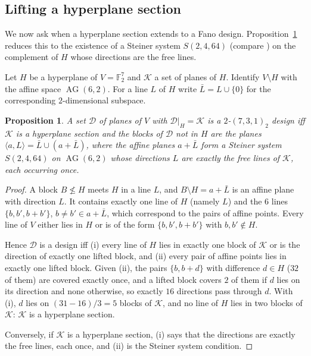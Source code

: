 \documentclass[11pt]{amsart}
\newtheorem{proposition}[theorem]{Proposition}
\theoremstyle{definition}
\newcommand{\F}{\mathbb{F}}
\newcommand{\D}{\mathcal{D}}
\newcommand{\K}{\mathcal{K}}
\newcommand{\AG}{\operatorname{AG}}
\begin{document}
\subsection{Lifting a hyperplane section}
We now ask when a hyperplane section extends to a Fano design. Proposition~\ref{prop:lift} reduces this to the existence of a Steiner system $S(2,4,64)$ \textup{(}compare \cite[Thm.~3.1]{EV11}\textup{)} on the complement of $H$ whose directions are the free lines.

Let $H$ be a hyperplane of $V=\F_2^7$ and $\K$ a set of planes of $H$. Identify $V\setminus H$ with the affine space $\AG(6,2)$. For a line $L$ of $H$ write $\bar L=L\cup\{0\}$ for the corresponding $2$-dimensional subspace.

\begin{proposition}\label{prop:lift}
A set $\D$ of planes of $V$ with $\D|_H=\K$ is a $2$-$(7,3,1)_2$ design iff $\K$ is a hyperplane section and the blocks of $\D$ not in $H$ are the planes $\langle a,L\rangle=\bar L\cup(a+\bar L)$, where the affine planes $a+\bar L$ form a Steiner system $S(2,4,64)$ on $\AG(6,2)$ whose directions $L$ are exactly the free lines of $\K$, each occurring once.
\end{proposition}

\begin{proof}
A block $B\not\le H$ meets $H$ in a line $L$, and $B\setminus H=a+\bar L$ is an affine plane with direction $L$. It contains exactly one line of $H$ (namely $L$) and the $6$ lines $\{b,b',b+b'\}$, $b\ne b'\in a+\bar L$, which correspond to the pairs of affine points. Every line of $V$ either lies in $H$ or is of the form $\{b,b',b+b'\}$ with $b,b'\notin H$.

Hence $\D$ is a design iff (i) every line of $H$ lies in exactly one block of $\K$ or is the direction of exactly one lifted block, and (ii) every pair of affine points lies in exactly one lifted block. Given (ii), the pairs $\{b,b+d\}$ with difference $d\in H$ ($32$ of them) are covered exactly once, and a lifted block covers $2$ of them if $d$ lies on its direction and none otherwise, so exactly $16$ directions pass through $d$. With (i), $d$ lies on $(31-16)/3=5$ blocks of $\K$, and no line of $H$ lies in two blocks of $\K$: $\K$ is a hyperplane section.

Conversely, if $\K$ is a hyperplane section, (i) says that the directions are exactly the free lines, each once, and (ii) is the Steiner system condition.
\end{proof}
\end{document}
